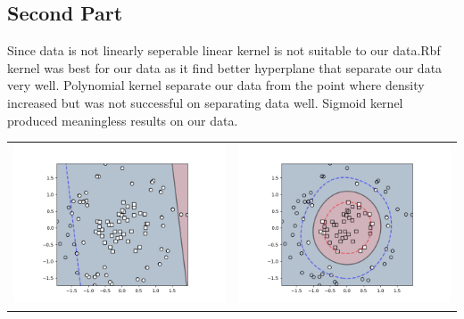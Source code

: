 \documentclass{article}
\begin{document}
\subsection{Second Part}
Since data is not linearly seperable linear kernel is not suitable to our data.Rbf kernel was best for our data as it find better hyperplane that separate our data very well. Polynomial kernel separate our data from the point where density increased but was not successful on separating data well. Sigmoid kernel produced meaningless results on our data.\\
\begin{tabular}{c|c}
\includegraphics[scale=0.4]{hw3images/svmsecondarypartlinearkernel.png}&\includegraphics[scale=0.4]{hw3images/svmsecondarypartrbfkernel.png}\\

\end{tabular}
\end{document}
